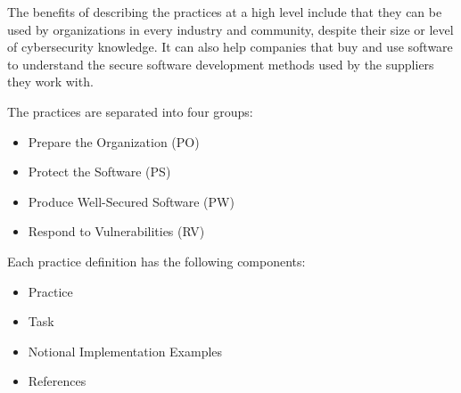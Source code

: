 The benefits of describing the practices at a high level include that they can be used by organizations in every industry and community, despite their size or level of cybersecurity knowledge. It can also help companies that buy and use software to understand the secure software development methods used by the suppliers they work with. 

The practices are separated into four groups:
\begin{itemize}
  \item Prepare the Organization (PO)
  \item Protect the Software (PS)
  \item Produce Well-Secured Software (PW)
  \item Respond to Vulnerabilities (RV)
\end{itemize}

Each practice definition has the following components:
\begin{itemize}
  \item Practice
  \item Task
  \item Notional Implementation Examples
  \item References
\end{itemize}




